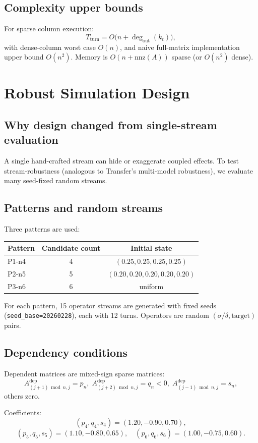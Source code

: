 \documentclass[11pt,a4paper]{article}
\begin{document}
\subsection{Complexity upper bounds}
For sparse column execution:
\[
T_{\text{turn}}=O\big(n+\deg_{\text{out}}(k_t)\big),
\]
with dense-column worst case \(O(n)\), and naive full-matrix implementation upper bound \(O(n^2)\). Memory is \(O(n+\mathrm{nnz}(A))\) sparse (or \(O(n^2)\) dense).

\section{Robust Simulation Design}
\subsection{Why design changed from single-stream evaluation}
A single hand-crafted stream can hide or exaggerate coupled effects. To test stream-robustness (analogous to Transfer's multi-model robustness), we evaluate many seed-fixed random streams.

\subsection{Patterns and random streams}
Three patterns are used:
\begin{center}
\begin{tabular}{@{}lcc@{}}
\toprule
Pattern & Candidate count & Initial state \\
\midrule
P1-n4 & 4 & $(0.25,0.25,0.25,0.25)$ \\
P2-n5 & 5 & $(0.20,0.20,0.20,0.20,0.20)$ \\
P3-n6 & 6 & uniform \\
\bottomrule
\end{tabular}
\end{center}
For each pattern, 15 operator streams are generated with fixed seeds (\texttt{seed\_base=20260228}), each with 12 turns. Operators are random \((\sigma/\delta,\text{target})\) pairs.

\subsection{Dependency conditions}
Dependent matrices are mixed-sign sparse matrices:
\[
A^{\mathrm{dep}}_{(j+1)\bmod n,j}=p_n,\;
A^{\mathrm{dep}}_{(j+2)\bmod n,j}=q_n<0,\;
A^{\mathrm{dep}}_{(j-1)\bmod n,j}=s_n,
\]
others zero.

Coefficients:
\[
(p_4,q_4,s_4)=(1.20,-0.90,0.70),
\]
\[
(p_5,q_5,s_5)=(1.10,-0.80,0.65),\quad
(p_6,q_6,s_6)=(1.00,-0.75,0.60).
\]
\end{document}
